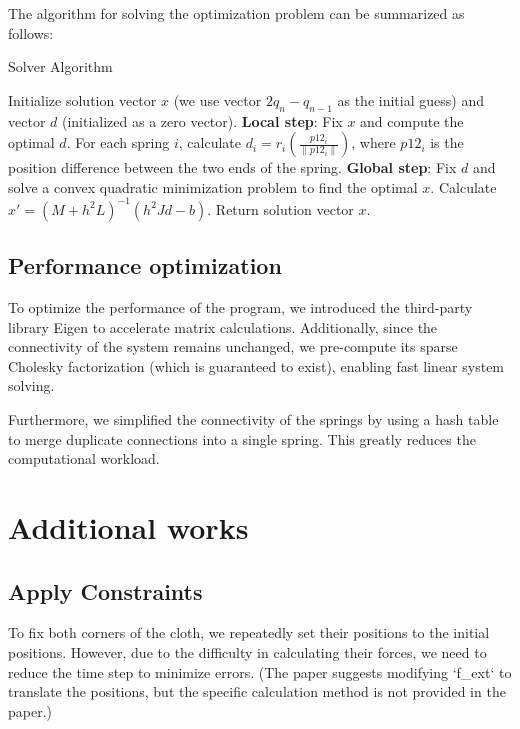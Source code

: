 \documentclass[acmtog]{acmart}
\begin{document}
The algorithm for solving the optimization problem can be summarized as follows:

\begin{algorithm}
    \caption{Solver Algorithm}
    \label{alg:solver}
    \begin{algorithmic}[1]
    \State Initialize solution vector $x$ (we use vector $2q_n - q_{n-1}$ as the initial guess) and vector $d$ (initialized as a zero vector).
        \State \textbf{Local step}: Fix $x$ and compute the optimal $d$.
        \State  For each spring $i$, calculate $d_i = r_i \left(\frac{p12_i}{\|p12_i\|}\right)$, where $p12_i$ is the position difference between the two ends of the spring.
        \State \textbf{Global step}: Fix $d$ and solve a convex quadratic minimization problem to find the optimal $x$. 
        \State Calculate $x' = (M+h^2L)^{-1}(h^2 J d - b)$.
    \EndFor
    \State Return solution vector $x$.
    \end{algorithmic}
\end{algorithm}


\subsection{Performance optimization}

To optimize the performance of the program, we introduced the third-party library Eigen to accelerate matrix calculations. Additionally, since the connectivity of the system remains unchanged, we pre-compute its sparse Cholesky factorization (which is guaranteed to exist), enabling fast linear system solving.

Furthermore, we simplified the connectivity of the springs by using a hash table to merge duplicate connections into a single spring. This greatly reduces the computational workload.

\section{Additional works}

\subsection{Apply Constraints}

To fix both corners of the cloth, we repeatedly set their positions to the initial positions. However, due to the difficulty in calculating their forces, we need to reduce the time step to minimize errors. (The paper suggests modifying `f\_ext` to translate the positions, but the specific calculation method is not provided in the paper.)
\end{document}

